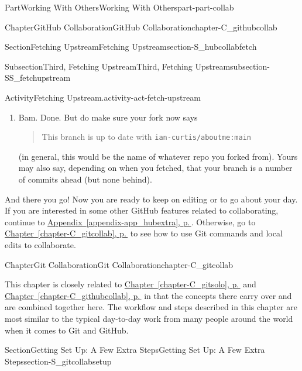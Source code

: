 \documentclass[twoside,10pt,]{book}
\newcommand{\xreffont}{\relax}
\newcommand{\mono}[1]{\texttt{#1}}
\begin{document}
\begin{partptx}{Part}{Working With Others}{}{Working With Others}{}{}{part-part-collab}
\begin{chapterptx}{Chapter}{GitHub Collaboration}{}{GitHub Collaboration}{}{}{chapter-C_githubcollab}
\begin{sectionptx}{Section}{Fetching Upstream}{}{Fetching Upstream}{}{}{section-S_hubcollabfetch}
\begin{subsectionptx}{Subsection}{Third, Fetching Upstream}{}{Third, Fetching Upstream}{}{}{subsection-SS_fetchupstream}
\begin{activity}{Activity}{Fetching Upstream.}{activity-act-fetch-upstream}
\begin{enumerate}[font=\bfseries,label=(\alph*),ref=\alph*]
\par
To make the magic happen, click on ``Fetch and merge''.%
\item{}Bam. Done. But do make sure your fork now says%
\begin{quote}%
This branch is up to date with \mono{ian-curtis/aboutme:main}%
\end{quote}
(in general, this would be the name of whatever repo you forked from). Yours may also say, depending on when you fetched, that your branch is a number of commits ahead (but none behind).%
\end{enumerate}%
\end{activity}%
\end{subsectionptx}
\begin{conclusion}{}%
And there you go! Now you are ready to keep on editing or to go about your day. If you are interested in some other GitHub features related to collaborating, continue to \hyperref[appendix-app_hubextra]{Appendix~{\xreffont\ref{appendix-app_hubextra}}, p.\,\pageref{appendix-app_hubextra}}. Otherwise, go to \hyperref[chapter-C_gitcollab]{Chapter~{\xreffont\ref{chapter-C_gitcollab}}, p.\,\pageref{chapter-C_gitcollab}} to see how to use Git commands and local edits to collaborate.%
\end{conclusion}%
\end{sectionptx}
\end{chapterptx}
%
\typeout{************************************************}
\typeout{************************************************}
%
\begin{chapterptx}{Chapter}{Git Collaboration}{}{Git Collaboration}{}{}{chapter-C_gitcollab}
\renewcommand*{\chaptername}{Chapter}
\begin{introduction}{}%
This chapter is closely related to \hyperref[chapter-C_gitsolo]{Chapter~{\xreffont\ref{chapter-C_gitsolo}}, p.\,\pageref{chapter-C_gitsolo}} and \hyperref[chapter-C_githubcollab]{Chapter~{\xreffont\ref{chapter-C_githubcollab}}, p.\,\pageref{chapter-C_githubcollab}} in that the concepts there carry over and are combined together here. The workflow and steps described in this chapter are most similar to the typical day-to-day work from many people around the world when it comes to Git and GitHub.%
\end{introduction}%
%
%
\typeout{************************************************}
\typeout{************************************************}
%
\begin{sectionptx}{Section}{Getting Set Up: A Few Extra Steps}{}{Getting Set Up: A Few Extra Steps}{}{}{section-S_gitcollabsetup}

\end{sectionptx}
\end{chapterptx}
\end{partptx}
\end{document}
